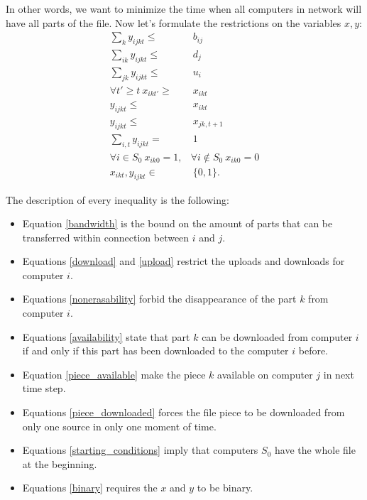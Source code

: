 \documentclass[10pt,a4paper]{article}
\begin{document}
In other words, we want to minimize the time when all computers in network will have all parts of the file. Now let's formulate the restrictions on the variables $x, y$:
\begin{align}
	\label{bandwidth}	\sum_k y_{ijkt} \leqslant & \ b_{ij} \\ 
	\label{download}	\sum_{ik} y_{ijkt} \leqslant & \ d_j \\ 
	\label{upload}	\sum_{jk} y_{ijkt} \leqslant & \ u_i \\ 
	\label{nonerasability}	\forall t' \geqslant t \  x_{ikt'} \geqslant & \ x_{ikt} \\ 
	\label{availability}	y_{ijkt} \leqslant & \ x_{ikt} \\
	\label{piece_available} y_{ijkt} \leqslant & \ x_{jk,t+1} \\
	\label{piece_downloaded} \sum\limits_{i,t} y_{ijkt} = & \ 1 \\
	\label{starting_conditions} \forall i \in S_0 \ x_{ik0} = 1, & \forall i \notin S_0 \ x_{ik0} = 0 \\
	\label{binary} x_{ikt}, y_{ijkt} \in & \ \{0, 1 \}.
\end{align}

The description of every inequality is the following:
\begin{itemize}
	\item Equation \eqref{bandwidth} is the bound on the amount of parts that can be transferred within connection between $i$ and $j$.
	\item Equations \eqref{download} and \eqref{upload} restrict the uploads and downloads for computer $i$.
	\item Equations \eqref{nonerasability} forbid the disappearance of the part $k$ from computer $i$.
	\item Equations \eqref{availability} state that part $k$ can be downloaded from computer $i$ if and only if this part has been downloaded to the computer $i$ before.
	\item Equation \eqref{piece_available} make the piece $k$ available on computer $j$ in next time step.
	\item Equations \eqref{piece_downloaded} forces the file piece to be downloaded from only one source in only one moment of time.
	\item Equations \eqref{starting_conditions} imply that computers $S_0$ have the whole file at the beginning.
	\item Equations \eqref{binary} requires the $x$ and $y$ to be binary.
\end{itemize}
\end{document}
